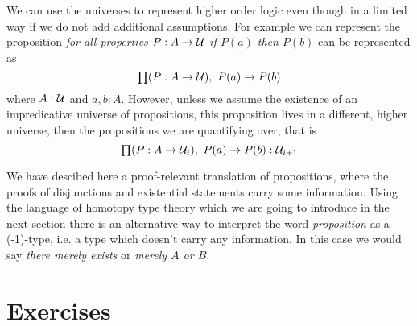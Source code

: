 We can use the universes to represent higher order logic even though in a limited way if we do not add additional assumptions. For example we can represent the proposition \emph{for all properties $P : A \to \mathcal{U}$ if $P(a)$ then $P(b)$} can be represented as
\[ \prd{P : A \to \UU} P(a) \to P(b) \]
where $A : \mathcal{U}$ and $a,b : A$. However, unless we assume the existence
of an impredicative universe of propositions, this
proposition  lives in a different, higher universe, then the
propositions we are quantifying over, that is
\[ \prd{P : A \to \UU_i} P(a) \to P(b) : \UU_{i+1} \]

We have descibed here a proof-relevant translation of propositions, where the proofs of disjunctions and existential statements carry some information. Using the language of homotopy type theory which we are going to introduce in the next section there is an alternative way to interpret the word \emph{proposition} as a (-1)-type, i.e. a type which doesn't carry any information. In this case we would say \emph{there merely exists} or \emph{merely $A$ or $B$}.

\section*{Exercises}

